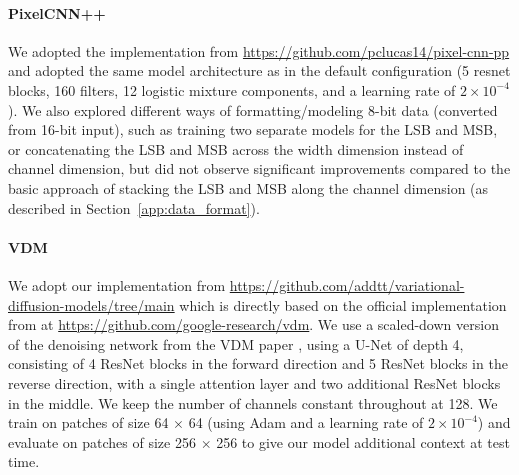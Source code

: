 \paragraph{PixelCNN++} 
We adopted the implementation from \url{https://github.com/pclucas14/pixel-cnn-pp} and adopted the same model architecture as in the default configuration (5 resnet blocks, 160 filters, 12 logistic mixture components, and a learning rate of $2\times 10^{-4}$).
We also explored different ways of formatting/modeling 8-bit data (converted from 16-bit input), such as training two separate models for the LSB and MSB, or concatenating the LSB and MSB across the width dimension instead of channel dimension, but did not observe significant improvements compared to the basic approach of stacking the LSB and MSB along the channel dimension (as described in Section~\ref{app:data_format}).

\paragraph{VDM} We adopt our implementation from \url{https://github.com/addtt/variational-diffusion-models/tree/main} which is directly based on the official implementation from \citet{kingma2021variational} at \url{https://github.com/google-research/vdm}. We use a scaled-down version of the denoising network from the VDM paper \citep{kingma2021variational}, using a U-Net of depth 4, consisting of 4 ResNet blocks in the forward
direction and 5 ResNet blocks in the reverse direction, with a single attention layer and two additional ResNet blocks in the middle. We keep the number of channels constant throughout at 128. We train on patches of size 64 $\times$ 64 (using Adam and a learning rate of $2\times 10^{-4}$) and evaluate on patches of size 256 $\times$ 256 to give our model additional context at test time.


